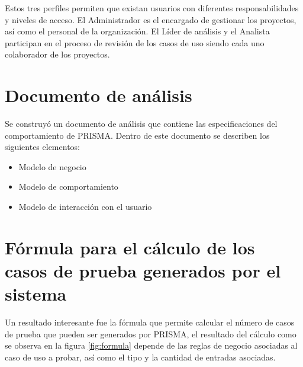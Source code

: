 Estos tres perfiles permiten que existan usuarios con diferentes responsabilidades y niveles de acceso. El Administrador es el encargado de gestionar los proyectos, así como el personal de la organización. El Líder
de análisis y el Analista participan en el proceso de revisión de los casos de uso siendo cada uno colaborador de los proyectos.\\

\section{Documento de análisis}
Se construyó un documento de análisis que contiene las especificaciones del comportamiento de PRISMA. Dentro de este documento se describen los siguientes elementos:

\begin{itemize}
 \item Modelo de negocio
 \item Modelo de comportamiento
 \item Modelo de interacción con el usuario
\end{itemize}

\clearpage 

\section{Fórmula para el cálculo de los casos de prueba generados por el sistema}
Un resultado interesante fue la fórmula que permite calcular el número de casos de prueba que pueden ser generados por PRISMA, el resultado del cálculo como se observa en la figura \ref{fig:formula} 
depende de las reglas de negocio asociadas al caso de uso a probar, así como el tipo y la cantidad de entradas asociadas.

